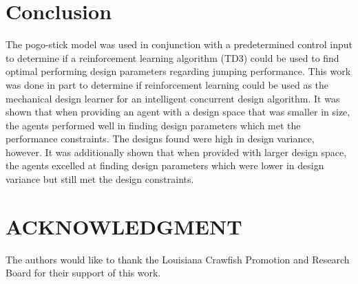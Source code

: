 \documentclass[letterpaper, 10 pt, conference]{ieeeconf}  %
\begin{document}
\section{Conclusion}
\label{sec:conclusion}
The pogo-stick model was used in conjunction with a predetermined control input to determine if a reinforcement learning algorithm (TD3) could be used to find optimal performing design parameters regarding jumping performance. This work was done in part to determine if reinforcement learning could be used as the mechanical design learner for an intelligent concurrent design algorithm. It was shown that when providing an agent with a design space that was smaller in size, the agents performed well in finding design parameters which met the performance constraints. The designs found were high in design variance, however. It was additionally shown that when provided with larger design space, the agents excelled at finding design parameters which were lower in design variance but still met the design constraints. 

\addtolength{\textheight}{-7.5cm}   %

\section*{ACKNOWLEDGMENT}

The authors would like to thank the Louisiana Crawfish Promotion and Research Board for their support of this work.

\end{document}
